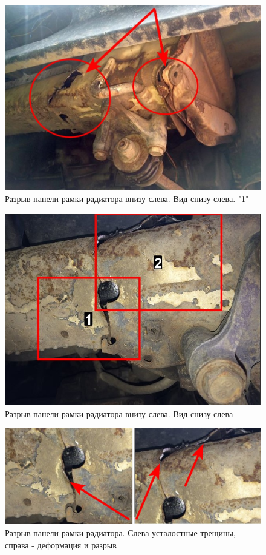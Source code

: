 \begin{figure}[!h]
	\centering
	\includegraphics[width=0.98\linewidth]{images/tc7}
	\caption{{\footnotesize {Разрыв панели рамки радиатора внизу слева. Вид снизу слева. "1" - }}}
	\label{ris:images/tc7}
\end{figure}

\begin{figure}[!h]
	\centering
	\includegraphics[width=0.98\linewidth]{images/tc11}
	\caption{{\footnotesize {Разрыв панели рамки радиатора внизу слева. Вид снизу слева}}}
	\label{ris:images/tc11}
\end{figure}

\begin{figure}[H]
	\centering
	\includegraphics[width=0.98\linewidth]{images/tc12}
	\caption{{\footnotesize {Разрыв панели рамки радиатора. Слева усталостные трещины, справа - деформация и разрыв}}}
	\label{ris:images/tc12}
\end{figure}


